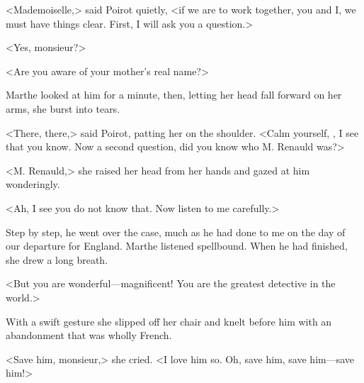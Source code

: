  <Mademoiselle,> said Poirot quietly, <if we are to work together, you and I, we must have things clear. First, I will ask you a question.> 

 <Yes, monsieur?> 

 <Are you aware of your mother's real name?> 

 Marthe looked at him for a minute, then, letting her head fall forward on her arms, she burst into tears. 

 <There, there,> said Poirot, patting her on the shoulder. <Calm yourself, , I see that you know. Now a second question, did you know who M. Renauld was?> 

 <M. Renauld,> she raised her head from her hands and gazed at him wonderingly. 

 <Ah, I see you do not know that. Now listen to me carefully.> 

 Step by step, he went over the case, much as he had done to me on the day of our departure for England. Marthe listened spellbound. When he had finished, she drew a long breath. 

 <But you are wonderful—magnificent! You are the greatest detective in the world.> 

 With a swift gesture she slipped off her chair and knelt before him with an abandonment that was wholly French. 

 <Save him, monsieur,> she cried. <I love him so. Oh, save him, save him—save him!>